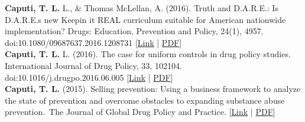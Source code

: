 \textbf{\textbf{Caputi, T. L.}} L., & Thomas McLellan, A. (2016). Truth and D.A.R.E.: Is D.A.R.E.s new Keepin it REAL curriculum suitable for American nationwide implementation? Drugs: Education, Prevention and Policy, 24(1), 4957. doi:10.1080/09687637.2016.1208731 [\href{https://www.tandfonline.com/doi/full/10.1080/09687637.2016.1208731}{Link} | \href{https://www.theodorecaputi.com/files/DEPP-2016.pdf}{PDF}] \\[.2cm]
\textbf{\textbf{Caputi, T. L.}} L. (2016). The case for uniform controls in drug policy studies. International Journal of Drug Policy, 33, 102104. doi:10.1016/j.drugpo.2016.06.005 [\href{https://www.sciencedirect.com/science/article/abs/pii/S095539591630175X}{Link} | \href{https://www.theodorecaputi.com/files/IJDP-2016.pdf}{PDF}] \\[.2cm]
\textbf{\textbf{Caputi, T. L.}} (2015). Selling prevention: Using a business framework to analyze the state of prevention and overcome obstacles to expanding substance abuse prevention. The Journal of Global Drug Policy and Practice. [\href{https://www.dfaf.org/wp-content/uploads/2018/11/Vol-9-Issue-1.pdf}{Link} | \href{https://www.theodorecaputi.com/files/JGDPP-2015.pdf}{PDF}] \\[.2cm]

